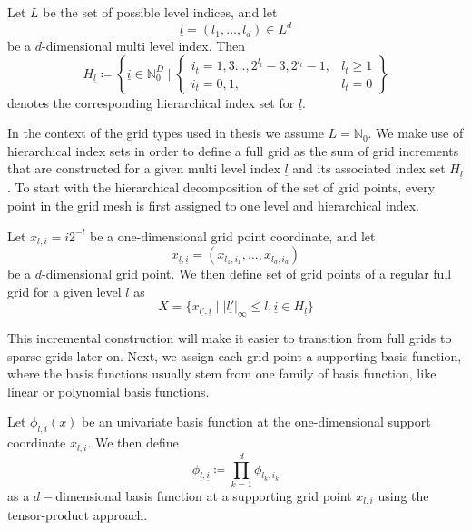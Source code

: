 \documentclass[
  a4paper,  %
  twoside,  %
  bibliography=totoc,
  headsepline,
  cleardoublepage=empty,
  parskip=half,
  draft=false
]{scrbook}
\begin{document}
\begin{definition}
Let $L$ be the set of possible level indices, and let
\begin{equation}
\underline{l} = (l_1, \dots, l_d) \in L^d
\end{equation}
be a $d$-dimensional multi level index.
Then
\begin{equation}
H_{\underline{l}} \coloneqq \left\{ \underline{i} \in \mathbb{N}^D_0 \mid
\begin{cases}
    i_t=1,3\dots,2^{l_t} - 3, 2^{l_t} - 1, & l_t \geq 1 \\
    i_t=0,1, & l_t = 0
\end{cases} \right\}
\end{equation}
denotes the corresponding hierarchical index set for $\underline{l}$.
\end{definition}

In the context of the grid types used in thesis we assume $L=\mathds{N}_0$.
We make use of hierarchical index sets in order to define a full grid as the sum of grid increments that are constructed for a given multi level index $\underline{l}$ and its associated index set $H_{\underline{l}}$.
To start with the hierarchical decomposition of the set of grid points, every point in the grid mesh is first assigned to one level and hierarchical index.

\begin{definition}
Let $x_{l,i}=i2^{-l}$ be a one-dimensional grid point coordinate, and let
\begin{equation}
x_{\underline{l},\underline{i}}=(x_{l_1,i_1}, \dots, x_{l_d,i_d})
\end{equation}
be a $d$-dimensional grid point.
We then define set of grid points of a regular full grid for a given level $l$ as
\begin{equation}
X=\{x_{\underline{l'},\underline{i}} \mid |\underline{l'}|_{\infty} \leq l, \underline{i} \in H_{\underline{l}}\}
\end{equation}
\end{definition}

This incremental construction will make it easier to transition from full grids to sparse grids later on.
Next, we assign each grid point a supporting basis function, where the basis functions usually stem from one family of basis function, like linear or polynomial basis functions.

\begin{definition}
Let $\phi_{l,i}(x)$ be an univariate basis function at the one-dimensional support coordinate $x_{l,i}$.
We then define
\begin{equation}
\phi_{\underline{l},\underline{i}} \coloneqq \prod_{k=1}^{d} \phi_{l_k,i_k}
\end{equation}
as a $d-$dimensional basis function at a supporting grid point $x_{\underline{l},\underline{i}}$ using the tensor-product approach.
\end{definition}
\end{document}
